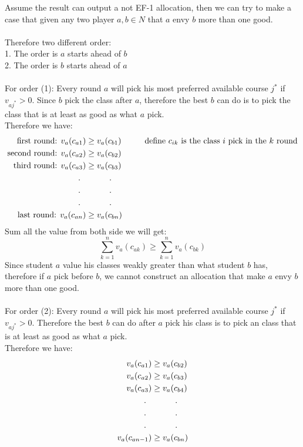 \documentclass{article}
\newcommand\tab[1][1cm]{\hspace*{#1}}
\begin{document}
Assume the result can output a not EF-1 allocation, then we can try to make a case that given any two player $a,b \in N$ that $a$ envy $b$ more than one good.\\\\
Therefore two different order:\\
1. The order is $a$ starts ahead of $b$\\
2. The order is $b$ starts ahead of $a$\\\\
For order (1): Every round $a$ will pick his most preferred available course $j^*$ if $v_{aj^*} > 0$. Since $b$ pick the class after $a$, therefore the best $b$ can do is to pick the class that is at least as good as what $a$ pick.\\
Therefore we have:
\begin{align*}
\text{first round: } v_a(c_{a1}) &\geq v_a(c_{b1}) \tab \text{define $c_{ik}$ is the class $i$ pick in the $k$ round}\\
\text{second round: } v_a(c_{a2}) &\geq v_a(c_{b2})\\
\text{third round: } v_a(c_{a3}) &\geq v_a(c_{b3})\\
.\ \ &\tab .\\
.\ \ &\tab .\\
.\ \ &\tab .\\
\text{last round: } v_a(c_{an}) &\geq v_a(c_{bn})\\
\end{align*}
Sum all the value from both side we will get:
$$\sum_{k = 1}^n v_a(c_{ak}) \geq \sum_{k = 1}^n v_a(c_{bk})$$
Since student $a$ value his classes weakly greater than what student $b$ has, therefore if $a$ pick before $b$, we cannot construct an allocation that make $a$ envy $b$ more than one good.\\\\
For order (2): Every round $a$ will pick his most preferred available course $j^*$ if $v_{aj^*} > 0$. Therefore the best $b$ can do after $a$ pick his class is to pick an class that is at least as good as what $a$ pick.\\
Therefore we have:
\begin{align*}
v_a(c_{a1}) &\geq v_a(c_{b2})\\
v_a(c_{a2}) &\geq v_a(c_{b3})\\
v_a(c_{a3}) &\geq v_a(c_{b4})\\
.\ \ &\tab .\\
.\ \ &\tab .\\
.\ \ &\tab .\\
v_a(c_{an-1}) &\geq v_a(c_{bn})\\
\end{align*}
\end{document}
